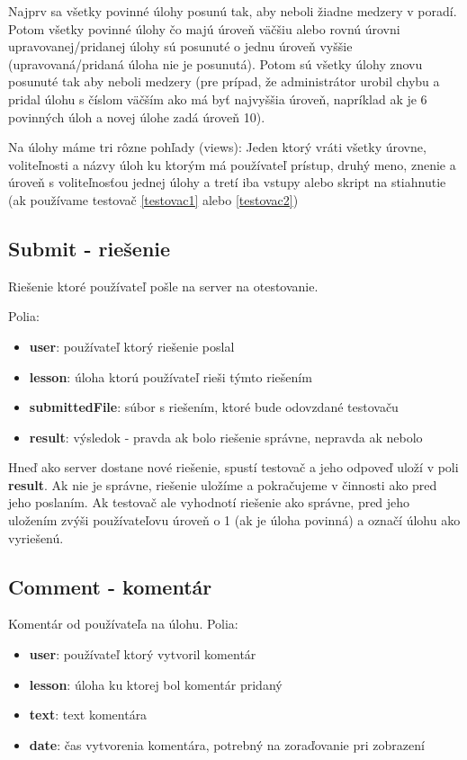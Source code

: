 Najprv sa všetky povinné úlohy posunú tak, aby neboli žiadne medzery v poradí.
Potom všetky povinné úlohy čo majú úroveň väčšiu alebo rovnú úrovni upravovanej/pridanej
úlohy sú posunuté o jednu úroveň vyššie (upravovaná/pridaná úloha nie je posunutá).
Potom sú všetky úlohy znovu posunuté tak aby neboli medzery (pre prípad, že administrátor
urobil chybu a pridal úlohu s číslom väčším ako má byť najvyššia úroveň, napríklad
ak je 6 povinných úloh a novej úlohe zadá úroveň 10).

Na úlohy máme tri rôzne pohľady (views): Jeden ktorý vráti všetky úrovne, voliteľnosti a názvy úloh ku ktorým má
používateľ prístup, druhý meno, znenie a úroveň s voliteľnosťou jednej úlohy a tretí
iba vstupy alebo skript na stiahnutie (ak používame testovač \ref{testovac1} alebo \ref{testovac2})

\subsection{Submit - riešenie}
Riešenie ktoré používateľ pošle na server na otestovanie.

Polia:
\begin{itemize}
\item \textbf{user}: používateľ ktorý riešenie poslal
\item \textbf{lesson}: úloha ktorú používateľ rieši týmto riešením
\item \textbf{submittedFile}: súbor s riešením, ktoré bude odovzdané testovaču
\item \textbf{result}: výsledok - pravda ak bolo riešenie správne, nepravda ak nebolo
\end{itemize}

Hneď ako server dostane nové riešenie, spustí testovač a jeho odpoveď uloží v poli
\textbf{result}. Ak nie je správne, riešenie uložíme a pokračujeme v činnosti ako pred jeho poslaním.
Ak testovač ale vyhodnotí riešenie ako správne, pred jeho uložením zvýši používateľovu
úroveň o 1 (ak je úloha povinná) a označí úlohu ako vyriešenú.

\subsection{Comment - komentár}
Komentár od používateľa na úlohu.
Polia:
\begin{itemize}
\item \textbf{user}: používateľ ktorý vytvoril komentár
\item \textbf{lesson}: úloha ku ktorej bol komentár pridaný
\item \textbf{text}: text komentára
\item \textbf{date}: čas vytvorenia komentára, potrebný na zoraďovanie pri zobrazení
\end{itemize}

